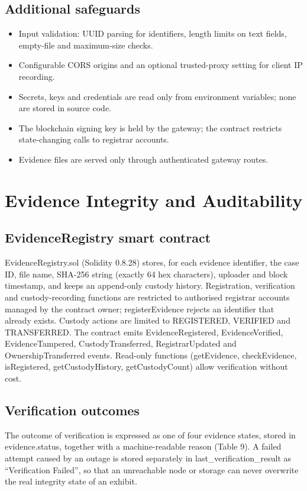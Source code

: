 \documentclass[12pt,a4paper,oneside]{report}
\newcommand{\code}[1]{{\small\ttfamily #1}}
\begin{document}
\subsection{Additional safeguards}
\begin{itemize}
  \item Input validation: UUID parsing for identifiers, length limits on text fields, empty-file and maximum-size checks.
  \item Configurable CORS origins and an optional trusted-proxy setting for client IP recording.
  \item Secrets, keys and credentials are read only from environment variables; none are stored in source code.
  \item The blockchain signing key is held by the gateway; the contract restricts state-changing calls to registrar accounts.
  \item Evidence files are served only through authenticated gateway routes.
\end{itemize}

\section{Evidence Integrity and Auditability}
\subsection{EvidenceRegistry smart contract}
\code{EvidenceRegistry.sol} (Solidity 0.8.28) stores, for each evidence identifier, the case ID, file name, SHA-256 string (exactly 64 hex characters), uploader and block timestamp, and keeps an append-only custody history. Registration, verification and custody-recording functions are restricted to authorised registrar accounts managed by the contract owner; \code{registerEvidence} rejects an identifier that already exists. Custody actions are limited to REGISTERED, VERIFIED and TRANSFERRED. The contract emits \code{EvidenceRegistered}, \code{EvidenceVerified}, \code{EvidenceTampered}, \code{CustodyTransferred}, \code{RegistrarUpdated} and \code{OwnershipTransferred} events. Read-only functions (\code{getEvidence}, \code{checkEvidence}, \code{isRegistered}, \code{getCustodyHistory}, \code{getCustodyCount}) allow verification without cost.

\subsection{Verification outcomes}
The outcome of verification is expressed as one of four evidence states, stored in \code{evidence.status}, together with a machine-readable reason (Table 9). A failed attempt caused by an outage is stored separately in \code{last\_\allowbreak{}verification\_\allowbreak{}result} as ``Verification Failed'', so that an unreachable node or storage can never overwrite the real integrity state of an exhibit.
\end{document}
